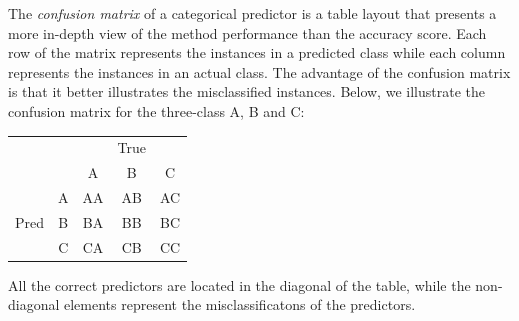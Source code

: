 \documentclass[../main.tex]{subfiles}
\begin{document}
The \textit{confusion matrix} of a categorical predictor is a table layout that presents a more in-depth view of the method performance than the accuracy score. Each row of the matrix represents the instances in a predicted class while each column represents the instances in an actual class. The advantage of the confusion matrix is that it better illustrates the misclassified instances. Below, we illustrate the confusion matrix for the three-class A, B and C:

\begin{table}[htb]
    \centering
    \begin{tabular}{c c | c c c}
    
     &&  & True & \\
     && A & B & C \\
    \midrule
    &A& AA & AB & AC\\
    Pred & B & BA & BB & BC\\
    &C& CA & CB & CC\\
 

    \end{tabular}
    \label{tab:confusion-matrix}
 \end{table}

All the correct predictors are located in the diagonal of the table, while the non-diagonal elements represent the misclassificatons of the predictors. 
\end{document}

